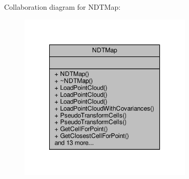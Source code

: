 Collaboration diagram for N\+D\+T\+Map\+:\nopagebreak
\begin{figure}[H]
\begin{center}
\leavevmode
\includegraphics[width=235pt]{d0/d07/classNDTMap__coll__graph}
\end{center}
\end{figure}
